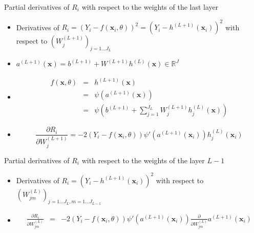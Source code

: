 \documentclass[ignorenonframetext,]{beamer}
\begin{document}
\begin{frame}{Partial derivatives of \(R_i\) with respect to the weights
of the last layer}
\protect\hypertarget{partial-derivatives-of-r_i-with-respect-to-the-weights-of-the-last-layer}{}

\begin{itemize}
\item
  Derivatives of
  \(R_i = \left(Y_{i} - f(\mathbf{x}_i,\theta)\right)^2= \left(Y_i - h^{(L+1)}(\mathbf{x}_i)\right)^2\)
  with respect to \((W_j^{(L+1)})_{j=1\dots J_{L}}\)
\item
  \(a^{(L+1)}(\mathbf{x}) = b^{(L+1)} +W^{(L+1)} h^{(L)}(\mathbf{x}) \in \mathbb{R}^J\)
\item
  \begin{eqnarray*}
  f(\mathbf{x} ,\theta) &=& h^{(L+1)}(\mathbf{x}) \\
  &=& \psi(a^{(L+1)}(\mathbf{x}))  \\
  & =& \psi\left(b^{(L+1)} +\sum_{j=1}^{J_L} W_j^{(L+1)} h_j^{(L)}(\mathbf{x}) \right)
  \end{eqnarray*}
\item
  \[ \frac{\partial R_i }{\partial W^{(L+1)}_{j}} = -2\left(Y_{i} - f(\mathbf{x}_i,\theta)\right)\psi'\left(a^{(L+1)}(\mathbf{x}_i)\right)h_j^{(L)}(\mathbf{x}_i)\]
\end{itemize}

\end{frame}

\begin{frame}{Partial derivatives of \(R_i\) with respect to the weights
of the layer \(L-1\)}
\protect\hypertarget{partial-derivatives-of-r_i-with-respect-to-the-weights-of-the-layer-l-1}{}

\begin{itemize}
\item
  Derivatives of \(R_i = \left(Y_i - h^{(L+1)}(\mathbf{x}_i)\right)^2\)
  with respect to \((W_{jm}^{(L)})_{j=1\dots J_{L},m=1\dots J_{L-1}}\)
\item
  \begin{eqnarray*}
  \frac{\partial R_i }{\partial W^{(L)}_{jm}} &=& -2\left(Y_{i} - f(\mathbf{x}_i,\theta)\right)\psi'\left(a^{(L+1)}(\mathbf{x}_i)\right) \frac{\partial}{\partial W^{(L)}_{jm}}  a^{(L+1)}(\mathbf{x}_i)
  \end{eqnarray*}
\end{itemize}

\end{frame}
\end{document}
